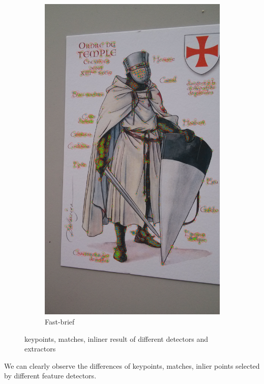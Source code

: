 \documentclass[10pt,conference,compsocconf]{IEEEtran}
\begin{document}
\begin{figure}[!ht]
\begin{subfigure}[b]{0.15\textwidth}
                \includegraphics[width=\textwidth]{f}
                \caption{Fast-brief}
                \label{fig:f}
        \end{subfigure}
        \caption{keypoints, matches, inliner result of different detectors and extractors}\label{fig:animals}
\end{figure}

We can clearly observe the differences of keypoints, matches, inlier points selected by different feature detectors.\\
\end{document}

